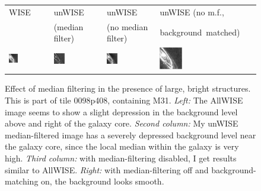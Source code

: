 \documentclass[11pt,preprint]{aastex}
\begin{document}
\begin{figure}
\setlength{\figw}{0.24\textwidth}
\newcommand{\spc}{\hspace{0.01\textwidth}}
\begin{center}
\begin{tabular}{@{}p{\figw}@{\spc}p{\figw}@{\spc}p{\figw}@{\spc}p{\figw}@{}}
{\small WISE} & 
{\small unWISE} &
{\small unWISE} &
{\small unWISE (no m.f.,} \\
&
{\small (median filter)} &
{\small (no median filter)} &
{\small \mbox{background matched)}} \\
%
\includegraphics[width=0.24\textwidth]{plots7/medfilt-bad-00} &
\includegraphics[width=0.24\textwidth]{plots7/medfilt-bad-02} &
\includegraphics[width=0.24\textwidth]{plots7/medfilt-bad-01} &
\includegraphics[width=0.24\textwidth]{plots7/medfilt-bad-03}
\end{tabular}
\end{center}
\vspace{-1.5em}
\caption{Effect of median filtering in the presence of large, bright
  structures.  This is part of tile 0098p408, containing M31.
  \emph{Left:} The AllWISE image seems to show a slight depression in
  the background level above and right of the galaxy core.
  \emph{Second column:} My unWISE median-filtered image has a
  severely depressed background level near the galaxy core, since the
  local median within the galaxy is very high.  \emph{Third column:}
  with median-filtering disabled, I get results similar to AllWISE.
  \emph{Right:} with median-filtering off and background-matching on,
  the background looks smooth.
\label{fig:badmedfilt}}
\end{figure}
\end{document}
